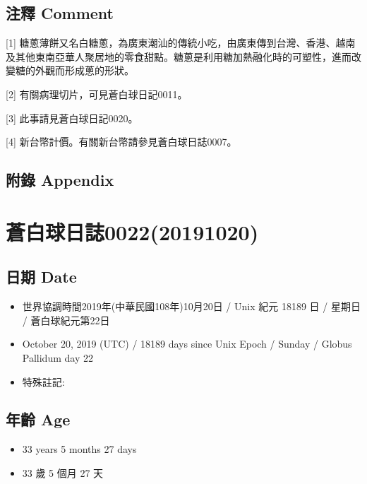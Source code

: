 \documentclass[a5paper, 12pt
]{book}
\providecommand{\tightlist}{%
  \setlength{\itemsep}{0pt}\setlength{\parskip}{0pt}}
\begin{document}
\hypertarget{ux6ce8ux91cb-comment-14}{%
\subsection{注釋 Comment}\label{ux6ce8ux91cb-comment-14}}

{[}1{]}
糖蔥薄餅又名白糖蔥，為廣東潮汕的傳統小吃，由廣東傳到台灣、香港、越南及其他東南亞華人聚居地的零食甜點。糖蔥是利用糖加熱融化時的可塑性，進而改變糖的外觀而形成蔥的形狀。

{[}2{]} 有關病理切片，可見蒼白球日記0011。

{[}3{]} 此事請見蒼白球日記0020。

{[}4{]} 新台幣計價。有關新台幣請參見蒼白球日誌0007。

\hypertarget{ux9644ux9304-appendix-13}{%
\subsection{附錄 Appendix}\label{ux9644ux9304-appendix-13}}

\hypertarget{ux84bcux767dux7403ux65e5ux8a8c002220191020}{%
\section{蒼白球日誌0022(20191020)}\label{ux84bcux767dux7403ux65e5ux8a8c002220191020}}

\hypertarget{ux65e5ux671f-date-19}{%
\subsection{日期 Date}\label{ux65e5ux671f-date-19}}

\begin{itemize}
\tightlist
\item
  世界協調時間2019年(中華民國108年)10月20日 / Unix 紀元 18189 日 /
  星期日 / 蒼白球紀元第22日
\item
  October 20, 2019 (UTC) / 18189 days since Unix Epoch / Sunday / Globus
  Pallidum day 22
\item
  特殊註記:
\end{itemize}

\hypertarget{ux5e74ux9f61-age-19}{%
\subsection{年齡 Age}\label{ux5e74ux9f61-age-19}}

\begin{itemize}
\tightlist
\item
  33 years 5 months 27 days
\item
  33 歲 5 個月 27 天
\end{itemize}
\end{document}
